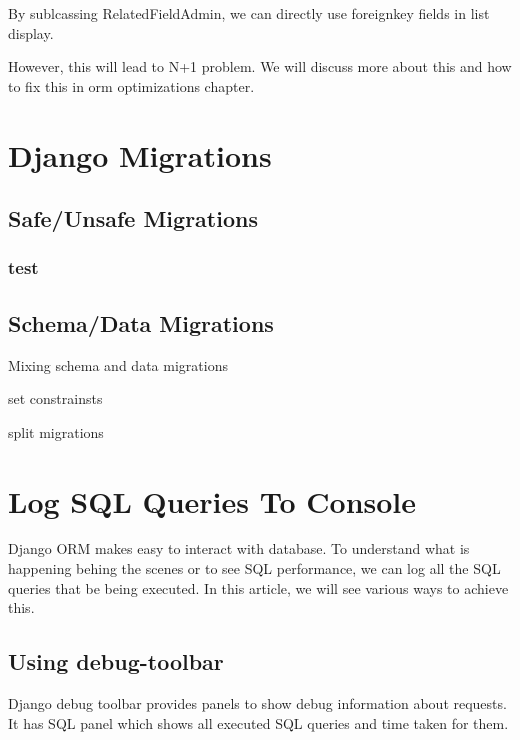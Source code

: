 \documentclass[letterpaper,11pt,english]{sphinxmanual}
\begin{document}
By sublcassing RelatedFieldAdmin, we can directly use foreignkey fields in list display.

However, this will lead to N+1 problem. We will discuss more about this and how to fix this in orm optimizations chapter.


\chapter{Django Migrations}
\label{\detokenize{orm_migrations:django-migrations}}\label{\detokenize{orm_migrations::doc}}

\section{Safe/Unsafe Migrations}
\label{\detokenize{orm_migrations:safe-unsafe-migrations}}

\subsection{test}
\label{\detokenize{orm_migrations:test}}

\section{Schema/Data Migrations}
\label{\detokenize{orm_migrations:schema-data-migrations}}
Mixing schema and data migrations

set constrainsts

split migrations


\chapter{Log SQL Queries To Console}
\label{\detokenize{orm_log_sql:log-sql-queries-to-console}}\label{\detokenize{orm_log_sql::doc}}
Django ORM makes easy to interact with database. To understand what is happening behing the scenes or to see SQL performance, we can log all the SQL queries that be being executed. In this article, we will see various ways to achieve this.


\section{Using debug-toolbar}
\label{\detokenize{orm_log_sql:using-debug-toolbar}}
Django debug toolbar provides panels to show debug information about requests. It has SQL panel which shows all executed SQL queries and time taken for them.
\end{document}
